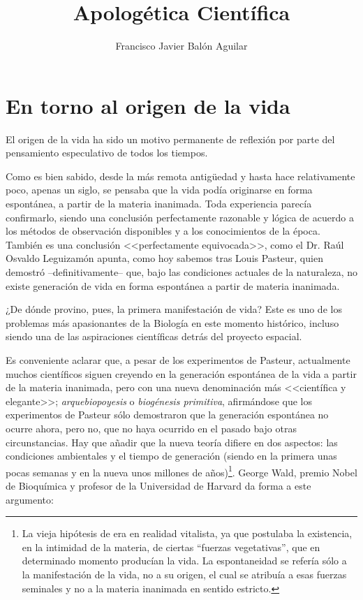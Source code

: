\documentclass[11pt, oneside, titlepage]{book}
\title{\textbf{Apologética Científica}}
\author{Francisco Javier Balón Aguilar}
\begin{document}
\maketitle
\tableofcontents
\newpage

\chapter{En torno al origen de la vida}

    El origen de la vida ha sido un motivo permanente de reflexión por parte del pensamiento especulativo 
    de todos los tiempos.
    
    Como es bien sabido, desde la más remota antigüedad y hasta hace relativamente poco, apenas un siglo, 
    se pensaba que la vida podía originarse en forma espontánea, a partir de la materia inanimada. Toda 
    experiencia parecía confirmarlo, siendo una conclusión perfectamente razonable y lógica de acuerdo a 
    los métodos de observación disponibles y a los conocimientos de la época. También es una conclusión 
    <<perfectamente equivocada>>, como el Dr. Raúl Osvaldo Leguizamón apunta, como hoy sabemos tras Louis 
    Pasteur, quien demostró --definitivamente-- que, bajo las condiciones actuales de la naturaleza, no 
    existe generación de vida en forma espontánea a partir de materia inanimada.

    ¿De dónde provino, pues, la primera manifestación de vida? Este es uno de los problemas más apasionantes 
    de la Biología en este momento histórico, incluso siendo una de las aspiraciones científicas detrás del 
    proyecto espacial.

    Es conveniente aclarar que, a pesar de los experimentos de Pasteur, actualmente muchos científicos
    siguen creyendo en la generación espontánea de la vida a partir de la materia inanimada, pero con una 
    nueva denominación más <<científica y elegante>>; \textit{arquebiopoyesis} o \textit{biogénesis primitiva}, 
    afirmándose que los experimentos de Pasteur sólo demostraron que la generación espontánea no ocurre ahora,
    pero no, que no haya ocurrido en el pasado bajo otras circunstancias. Hay que añadir que la nueva teoría
    difiere en dos aspectos: las condiciones ambientales y el tiempo de generación (siendo en la primera unas 
    pocas semanas y en la nueva unos millones de años)\footnote{
        La vieja hipótesis de era en realidad vitalista, ya que postulaba la existencia, en la intimidad de la materia, de ciertas “fuerzas vegetativas”, que en determinado momento producían la vida. La
        espontaneidad se refería sólo a la manifestación de la vida, no a su origen, el cual se atribuía a esas fuerzas
        seminales y no a la materia inanimada en sentido estricto.    
    }. George Wald, premio Nobel de 
    Bioquímica y profesor de la Universidad de Harvard da forma a este argumento:
\end{document}
